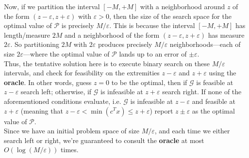 \documentclass[10pt, letterpaper]{article}
\begin{document}
\begin{enumerate}[label={\bfseries Q\arabic*.}]
    Now, if we partition the interval $[-M, +M]$ with a neighborhood around $z$ of the form $(z-\varepsilon, z+\varepsilon)$ with $\varepsilon > 0$, then the size
    of the search space for the optimal value of $\bm{\mathcal{P}}$ is precisely $M/\varepsilon$. This is because the interval $[-M, +M]$ has
    length/measure $2M$ and a neighborhood of the form $(z-\varepsilon, z+\varepsilon)$ has measure $2\varepsilon$. So
    partitioning $2M$ with $2\varepsilon$ produces precisely $M/\varepsilon$ neighborhoods---each of size $2\varepsilon$---where the optimal value of
    $\bm{\mathcal{P}}$ lands up to an error of $\pm\varepsilon$. \\

    Thus, the tentative solution here is to execute binary search on these $M/\varepsilon$ intervals, and check for feasibility on the extremities
    $z-\varepsilon$ and $z+\varepsilon$ using the \textbf{oracle}. In other words, guess $z = 0$ to be the optimal, then if $\bm{\mathcal{G}}$ is feasible
    at $z-\varepsilon$ search left; otherwise, if $\mathcal{G}$ is infeasible at $z+\varepsilon$ search right. If none of the aforementioned conditions
    evaluate, i.e. $\bm{\mathcal{G}}$ is infeasible at $z-\varepsilon$ and feasible at $z+\varepsilon$ (meaning that $z-\varepsilon < \min(c^Tx) \leq
    z+\varepsilon$) report $z\pm\varepsilon$ as the optimal value of $\bm{\mathcal{P}}$. \\

    Since we have an initial problem space of size $M/\varepsilon$, and each time we either search left or right, we're guaranteed to consult the
    \textbf{oracle} at most $O\left(\log\left(M/\varepsilon\right)\right)$ times.
\end{enumerate}
\end{document}
